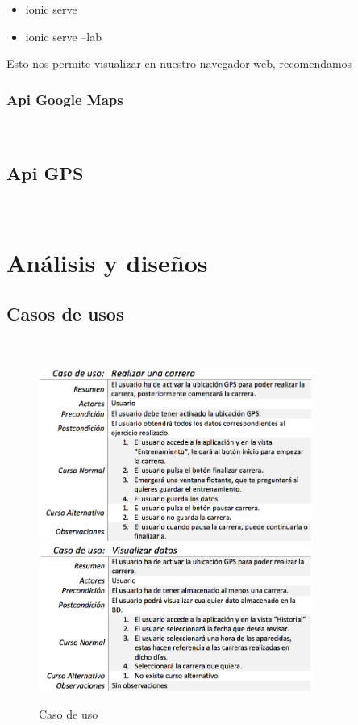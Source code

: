 \documentclass[a4paper, 11pt]{article}
\begin{document}
\begin{itemize}
            \begin{itemize}
                \item{ionic serve}
                \item{ionic serve --lab}
            \end{itemize}
            Esto nos permite visualizar en nuestro navegador web, recomendamos

            \subsubsection{Api Google Maps}\\

            \subsection{Api GPS}\\


\section{Análisis y diseños}

       \subsection{Casos de usos}\\

           \begin{figure}[H]
             \centering
                  \includegraphics[width=0.8\textwidth]{CasoDeUso-RealizarCarrera}
                  \includegraphics[width=0.8\textwidth]{CasoDeUso-VisualizarDatos}
            \caption{Caso de uso}
            \label{f:casosdeuso}
          \end{figure}


\end{itemize}
\end{document}
